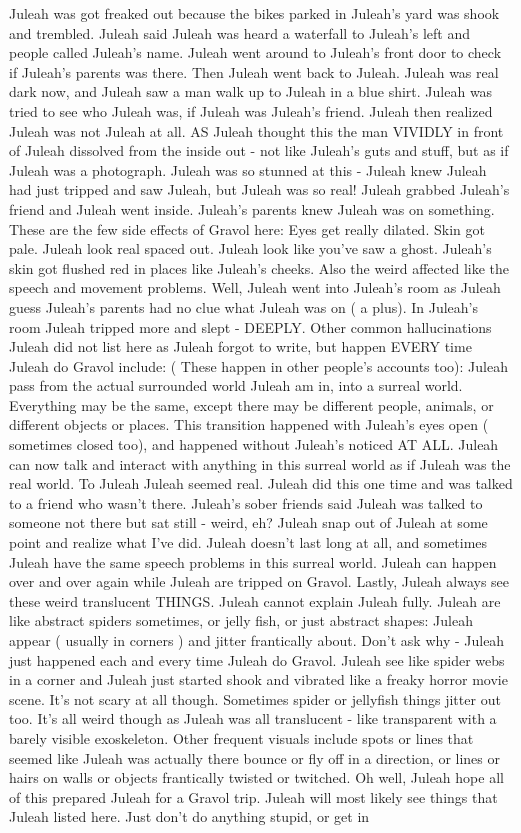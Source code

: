 \documentclass[12pt]{book}
\begin{document}
Juleah was got freaked out because the bikes parked in Juleah's yard was shook and trembled. Juleah said Juleah was heard a waterfall to Juleah's left and people called Juleah's name. Juleah went around to Juleah's front door to check if Juleah's parents was there. Then Juleah went back to Juleah. Juleah was real dark now, and Juleah saw a man walk up to Juleah in a blue shirt. Juleah was tried to see who Juleah was, if Juleah was Juleah's friend. Juleah then realized Juleah was not Juleah at all. AS Juleah thought this the man VIVIDLY in front of Juleah dissolved from the inside out - not like Juleah's guts and stuff, but as if Juleah was a photograph. Juleah was so stunned at this - Juleah knew Juleah had just tripped and saw Juleah, but Juleah was so real! Juleah grabbed Juleah's friend and Juleah went inside. Juleah's parents knew Juleah was on something. These are the few side effects of Gravol here: Eyes get really dilated. Skin got pale. Juleah look real spaced out. Juleah look like you've saw a ghost. Juleah's skin got flushed red in places like Juleah's cheeks. Also the weird affected like the speech and movement problems. Well, Juleah went into Juleah's room as Juleah guess Juleah's parents had no clue what Juleah was on ( a plus). In Juleah's room Juleah tripped more and slept - DEEPLY. Other common hallucinations Juleah did not list here as Juleah forgot to write, but happen EVERY time Juleah do Gravol include: ( These happen in other people's accounts too): Juleah pass from the actual surrounded world Juleah am in, into a surreal world. Everything may be the same, except there may be different people, animals, or different objects or places. This transition happened with Juleah's eyes open ( sometimes closed too), and happened without Juleah's noticed AT ALL. Juleah can now talk and interact with anything in this surreal world as if Juleah was the real world. To Juleah Juleah seemed real. Juleah did this one time and was talked to a friend who wasn't there. Juleah's sober friends said Juleah was talked to someone not there but sat still - weird, eh? Juleah snap out of Juleah at some point and realize what I've did. Juleah doesn't last long at all, and sometimes Juleah have the same speech problems in this surreal world. Juleah can happen over and over again while Juleah are tripped on Gravol. Lastly, Juleah always see these weird translucent THINGS. Juleah cannot explain Juleah fully. Juleah are like abstract spiders sometimes, or jelly fish, or just abstract shapes: Juleah appear ( usually in corners ) and jitter frantically about. Don't ask why - Juleah just happened each and every time Juleah do Gravol. Juleah see like spider webs in a corner and Juleah just started shook and vibrated like a freaky horror movie scene. It's not scary at all though. Sometimes spider or jellyfish things jitter out too. It's all weird though as Juleah was all translucent - like transparent with a barely visible exoskeleton. Other frequent visuals include spots or lines that seemed like Juleah was actually there bounce or fly off in a direction, or lines or hairs on walls or objects frantically twisted or twitched. Oh well, Juleah hope all of this prepared Juleah for a Gravol trip. Juleah will most likely see things that Juleah listed here. Just don't do anything stupid, or get in 
\end{document}
